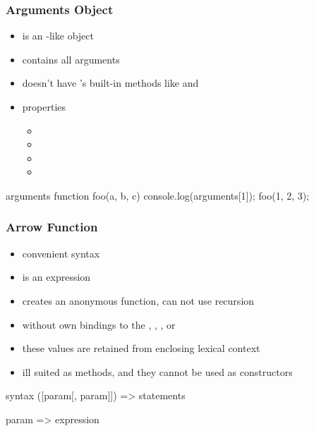 \begin{frame}[fragile] \frametitle{Arguments Object}
\begin{itemize}
  \item {} is an -like object
  \item contains all arguments
  \item doesn't have 's built-in methods like  and 
  \item properties
  \begin{itemize}
    \item {}
    \item {}
    \item {}
    \item {}
  \end{itemize}
\end{itemize}

\begin{CodeBox}{arguments}
function foo(a, b, c) {
  console.log(arguments[1]);
}
foo(1, 2, 3);
\end{CodeBox}
\end{frame}

\begin{frame}[fragile] \frametitle{Arrow Function}

\begin{itemize}
  \item convenient syntax
  \item is an expression
  \item creates an anonymous function, can not use recursion
  \item without own bindings to the , , , or 
  \item these values are retained from enclosing lexical context
  \item ill suited as methods, and they cannot be used as constructors
\end{itemize}
\begin{CodeBox}{syntax}
([param[, param]]) => {
   statements
}

param => expression
\end{CodeBox}
\end{frame}


